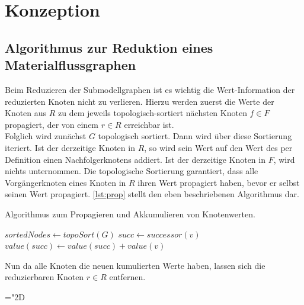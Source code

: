 \chapter{Konzeption} %





\section{Algorithmus zur Reduktion eines Materialflussgraphen} \label{sec:reduction}

Beim Reduzieren der Submodellgraphen ist es wichtig die Wert-Information der reduzierten Knoten nicht zu verlieren. Hierzu werden zuerst die Werte der Knoten aus $R$ zu dem jeweils topologisch-sortiert nächsten Knoten $f \in F$ propagiert, der von einem $r \in R$ erreichbar ist. \\
Folglich wird zunächst $G$ topologisch sortiert. Dann wird über diese Sortierung iteriert. Ist der derzeitige Knoten in $R$, so wird sein Wert auf den Wert des per Definition einen Nachfolgerknotens addiert. Ist der derzeitige Knoten in $F$, wird nichts unternommen. Die topologische Sortierung garantiert, dass alle Vorgängerknoten eines Knoten in $R$ ihren Wert propagiert haben, bevor er selbst seinen Wert propagiert. \autoref{lst:prop} stellt den eben beschriebenen Algorithmus dar.

\begin{algorithm}
	\caption{Algorithmus zum Propagieren und Akkumulieren von Knotenwerten.}\label{lst:prop}
	\begin{algorithmic}[1]
		 
			\State $sortedNodes \gets topoSort(G)$
					\State $succ \gets successor(v)$ 
					\State $value(succ) \gets value(succ) + value(v)$
				\EndIf
			\EndFor
		\EndProcedure
	\end{algorithmic}
\end{algorithm}

Nun da alle Knoten die neuen kumulierten Werte haben, lassen sich die reduzierbaren Knoten $r \in R$ entfernen. 

\mathchardef\mhyphen="2D

